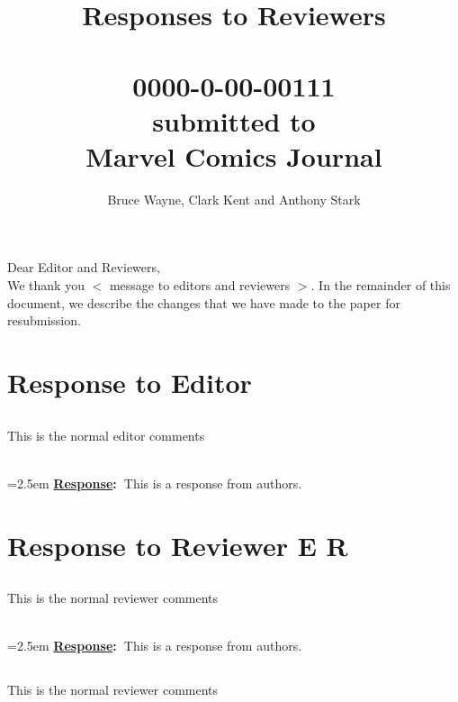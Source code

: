 \documentclass{article}
\newcommand{\answer}[1]{~\\\vspace{0.1em} \hangindent=2.5em \textbf{\textcolor{NavyBlue}{\uline{Response}:~}}\textcolor{NavyBlue}{#1}}
\newcommand\getcurrentref[1]{%
	\ifnumequal{\value{#1}}{0}
	{E}
	{R\the\value{#1}}%
}
\newcommand{\getCurrentSectionNumber}{\getcurrentref{section}}
\begin{document}
	\title{Responses to Reviewers\\~\\0000-0-00­-00111\\submitted to\\Marvel Comics Journal}
	
	\author{Bruce Wayne, Clark Kent and Anthony Stark}
	\maketitle 
	\noindent Dear Editor and Reviewers,\\
	
	\noindent We thank you $<$ message to editors and reviewers $>$.
	In the remainder of this document, we describe the changes that we have made to the paper for resubmission.
	
%	
	
	\section{Response to Editor}
	
	\subsection{} This is the normal editor comments
	
	\answer {This is a response from authors. }
	
		
	\section{Response to Reviewer \getCurrentSectionNumber}
	
	\subsection{} This is the normal reviewer comments
	
	\answer {This is a response from authors. }
	
	\subsection{} This is the normal reviewer comments
	
\end{document}
